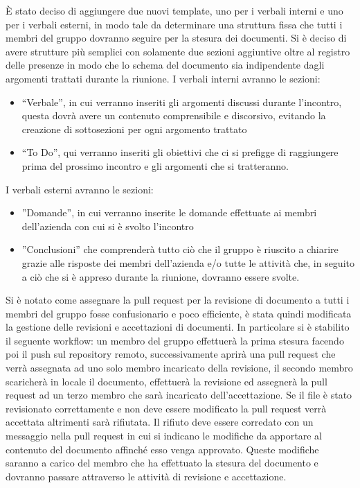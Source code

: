\documentclass[a4paper, 12pt]{article}
\begin{document}
È stato deciso di aggiungere due nuovi template, uno per i verbali interni e uno per i verbali esterni, in modo tale da determinare una struttura fissa che tutti i membri del gruppo dovranno seguire per la stesura dei documenti.
Si è deciso di avere strutture più semplici con solamente due sezioni aggiuntive oltre al registro delle presenze in modo che lo schema del documento sia indipendente dagli argomenti trattati durante la riunione. 
I verbali interni avranno le sezioni:
\begin{itemize}
    \item “Verbale”, in cui verranno inseriti gli argomenti discussi durante l’incontro, questa dovrà avere un contenuto comprensibile e discorsivo, evitando la creazione di sottosezioni per ogni argomento trattato
    \item “To Do”, qui verranno inseriti gli obiettivi che ci si prefigge di raggiungere prima del prossimo incontro e gli argomenti che si tratteranno.
\end{itemize}
I verbali esterni avranno le sezioni:
\begin{itemize}
    \item ”Domande”, in cui verranno inserite le domande effettuate ai membri dell’azienda con cui si è svolto l’incontro
    \item ”Conclusioni” che comprenderà tutto ciò che il gruppo è riuscito a chiarire grazie alle risposte dei membri dell’azienda e/o tutte le attività che, in seguito a ciò che si è appreso durante la riunione, dovranno essere svolte.
\end{itemize}

Si è notato come assegnare la pull request per la revisione di documento a tutti i membri del gruppo fosse confusionario e poco efficiente, è stata quindi modificata  la gestione delle revisioni e accettazioni di documenti.
In particolare si è stabilito il seguente workflow: un membro del gruppo effettuerà la prima stesura facendo poi il push sul repository remoto, successivamente aprirà una pull request che verrà assegnata ad uno solo membro incaricato della revisione, il secondo membro scaricherà in locale il documento, effettuerà la revisione ed assegnerà la pull request ad un terzo membro che sarà incaricato dell’accettazione.
Se il file è stato revisionato correttamente e non deve essere modificato la pull request verrà accettata altrimenti sarà rifiutata.
Il rifiuto deve essere corredato con un messaggio nella pull request in cui si indicano le modifiche da apportare al contenuto del documento affinché esso venga approvato.
Queste modifiche saranno a carico del membro che ha effettuato la stesura del documento e dovranno passare attraverso le attività di revisione e accettazione.
\end{document}
